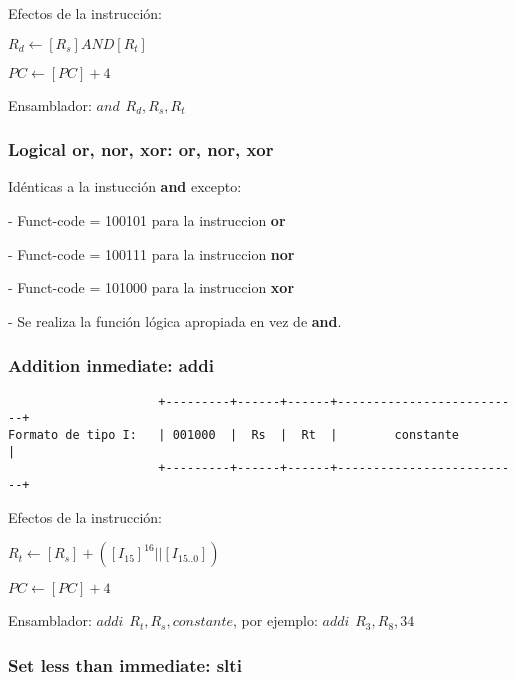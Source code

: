 \documentclass[letterpaper,11pt]{scrartcl}
\begin{document}
Efectos de la instrucción: 

$R_{d} \leftarrow [R_{s}] AND [R_{t}]$

$PC \leftarrow [PC] + 4$

Ensamblador: $and\hspace{5pt}R_{d}, R_{s}, R_{t}$


\subsubsection*{Logical or, nor, xor: \textbf{or, nor, xor}}

Idénticas a la instucción \textbf{and} excepto:

- Funct-code = 100101 para la instruccion \textbf{or}

- Funct-code = 100111 para la instruccion \textbf{nor}

- Funct-code = 101000 para la instruccion \textbf{xor}

- Se realiza la función lógica apropiada en vez de \textbf{and}.


\subsubsection*{Addition inmediate: \textbf{addi}}

\begin{verbatim}
                     +---------+------+------+--------------------------+
Formato de tipo I:   | 001000  |  Rs  |  Rt  |        constante         |
                     +---------+------+------+--------------------------+
\end{verbatim}

Efectos de la instrucción: 

$R_{t} \leftarrow [R_{s}] + ( [I_{15}]^{16} || [I_{15..0}] )$

$PC \leftarrow [PC] + 4$

Ensamblador: $addi\hspace{5pt}R_{t}, R_{s}, constante$, por ejemplo: $addi\hspace{5pt}R_{3}, R_{8}, 34$


\subsubsection*{Set less than immediate: \textbf{slti}}
\end{document}
